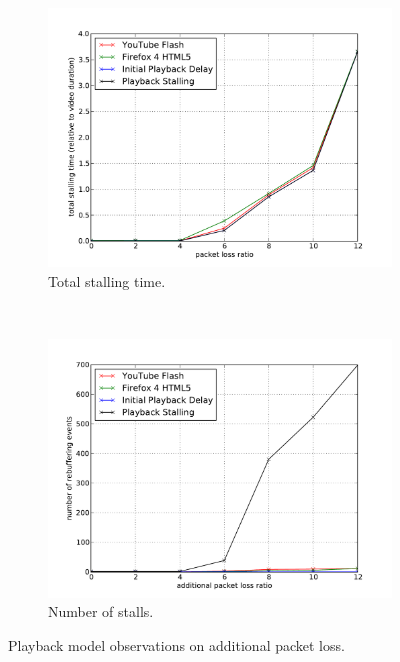 \begin{figure}
	\centering
    	\begin{subfigure}[b]{0.50\textwidth}
                \centering
                \includegraphics[width=\textwidth]{images/streaming/eval-loss4mb-stallingtime.pdf}
                \caption{Total stalling time.}
                \label{fig:eval-loss-stallingtime}
        \end{subfigure}%
        ~
    	\begin{subfigure}[b]{0.50\textwidth}
                \centering
                \includegraphics[width=\textwidth]{images/streaming/eval-loss4mb-frequency.pdf}
                \caption{Number of stalls.}
                \label{fig:eval-loss-numstalls}
        \end{subfigure}
	\caption{Playback model observations on additional packet loss.}
	\label{fig:eval-loss}
\end{figure}
 
